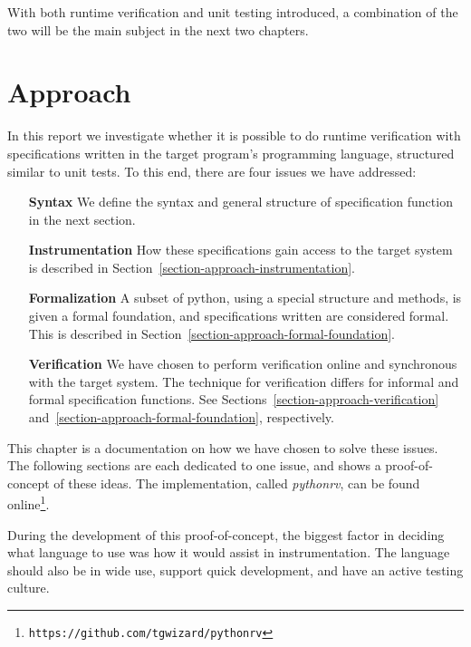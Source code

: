 \documentclass[a4paper,11pt]{kth-mag}
\theoremstyle{definition}
\begin{document}
With both runtime verification and unit testing introduced, a combination of
the two will be the main subject in the next two chapters.






\pagestyle{newchap}
\chapter{Approach} \label{chapter-approach}
\lstset{language=Python}

In this report we investigate whether it is possible to do runtime verification
with specifications written in the target program's programming language,
structured similar to unit tests. To this end, there are four issues we have
addressed:

\begin{itemize}
  \item[\textbf{Syntax}] We define the syntax and general structure of
    specification function in the next section.
  \item[\textbf{Instrumentation}] How these specifications gain access to the
    target system is described in
    Section~\ref{section-approach-instrumentation}.
  \item[\textbf{Formalization}] A subset of python, using a special structure
    and methods, is given a formal foundation, and specifications written are
    considered formal. This is described in
    Section~\ref{section-approach-formal-foundation}.
  \item[\textbf{Verification}] We have chosen to perform verification online
    and synchronous with the target system. The technique for verification
    differs for informal and formal specification functions.  See
    Sections~\ref{section-approach-verification}
    and~\ref{section-approach-formal-foundation}, respectively.
\end{itemize}

This chapter is a documentation on how we have chosen to solve these issues.
The following sections are each dedicated to one issue, and shows a
proof-of-concept of these ideas. The implementation, called \textit{pythonrv},
can be found online\footnote{\texttt{https://github.com/tgwizard/pythonrv}}.

During the development of this proof-of-concept, the biggest factor in deciding
what language to use was how it would assist in instrumentation. The language
should also be in wide use, support quick development, and have an active
testing culture.
\end{document}
